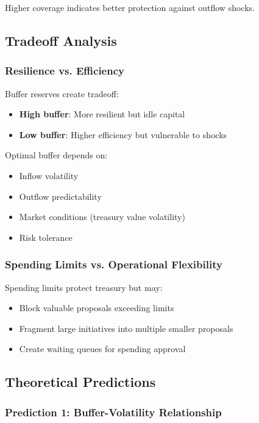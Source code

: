 Higher coverage indicates better protection against outflow shocks.

\subsection{Tradeoff Analysis}

\subsubsection{Resilience vs. Efficiency}

Buffer reserves create tradeoff:
\begin{itemize}
    \item \textbf{High buffer}: More resilient but idle capital
    \item \textbf{Low buffer}: Higher efficiency but vulnerable to shocks
\end{itemize}

Optimal buffer depends on:
\begin{itemize}
    \item Inflow volatility
    \item Outflow predictability
    \item Market conditions (treasury value volatility)
    \item Risk tolerance
\end{itemize}

\subsubsection{Spending Limits vs. Operational Flexibility}

Spending limits protect treasury but may:
\begin{itemize}
    \item Block valuable proposals exceeding limits
    \item Fragment large initiatives into multiple smaller proposals
    \item Create waiting queues for spending approval
\end{itemize}

\subsection{Theoretical Predictions}

\subsubsection{Prediction 1: Buffer-Volatility Relationship}

